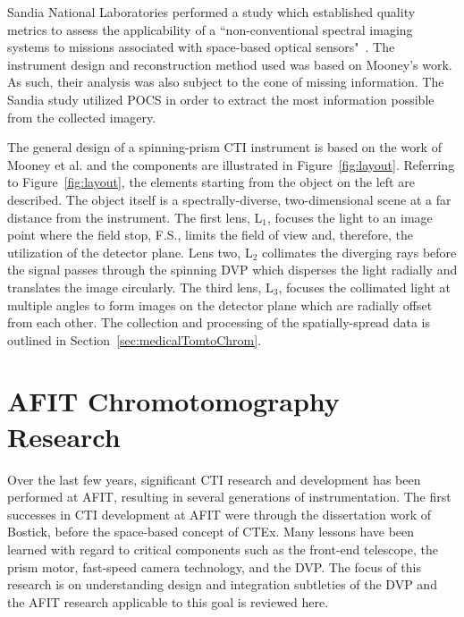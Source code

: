 Sandia National Laboratories performed a study which established quality metrics to assess the applicability of a ``non-conventional spectral imaging systems to missions associated with space-based optical sensors"~\cite{Sandia05}. The instrument design and reconstruction method used was based on Mooney's work. As such, their analysis was also subject to the cone of missing information. The Sandia study utilized \ac{POCS} in order to extract the most information possible from the collected imagery.

The general design of a spinning-prism \ac{CTI} instrument is based on the work of Mooney et al. and the components are illustrated in Figure~\ref{fig:layout}. Referring to Figure~\ref{fig:layout}, the elements starting from the object on the left are described. The object itself is a spectrally-diverse, two-dimensional scene at a far distance from the instrument. The first lens, L$_1$, focuses the light to an image point where the field stop, F.S., limits the field of view and, therefore, the utilization of the detector plane. Lens two, L$_2$ collimates the diverging rays before the signal passes through the spinning \ac{DVP} which disperses the light radially and translates the image circularly. The third lens, L$_3$, focuses the collimated light at multiple angles to form images on the detector plane which are radially offset from each other. The collection and processing of the spatially-spread data is outlined in Section~\ref{sec:medicalTomtoChrom}.

\section{AFIT Chromotomography Research}
\label{sec:afitResearch}

Over the last few years, significant \ac{CTI} research and development has been performed at \ac{AFIT}, resulting in several generations of instrumentation. The first successes in \ac{CTI} development at \ac{AFIT} were through the dissertation work of Bostick, before the space-based concept of \ac{CTEx}. Many lessons have been learned with regard to critical components such as the front-end telescope, the prism motor, fast-speed camera technology, and the \ac{DVP}. The focus of this research is on understanding design and integration subtleties of the \ac{DVP} and the \ac{AFIT} research applicable to this goal is reviewed here.

